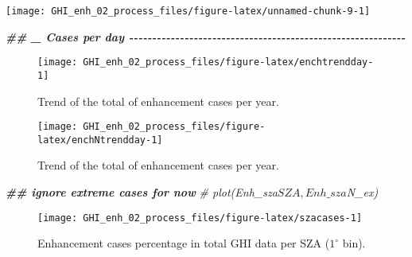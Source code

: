 \documentclass[
  10pt,
  a4paper,oneside]{article}
\newenvironment{Shaded}{\begin{snugshade}}{\end{snugshade}}
\newcommand{\CommentTok}[1]{\textcolor[rgb]{0.56,0.35,0.01}{\textit{#1}}}
\newcommand{\DocumentationTok}[1]{\textcolor[rgb]{0.56,0.35,0.01}{\textbf{\textit{#1}}}}
\begin{document}
\begin{center}\texttt{[image: GHI\_enh\_02\_process\_files/figure-latex/unnamed-chunk-9-1]} \end{center}

\begin{Shaded}
\begin{Highlighting}[]
\DocumentationTok{\#\# \_ Cases per day  {-}{-}{-}{-}{-}{-}{-}{-}{-}{-}{-}{-}{-}{-}{-}{-}{-}{-}{-}{-}{-}{-}{-}{-}{-}{-}{-}{-}{-}{-}{-}{-}{-}{-}{-}{-}{-}{-}{-}{-}{-}{-}{-}{-}{-}{-}{-}{-}{-}{-}{-}{-}{-}{-}{-}{-}{-}{-}{-}{-}}
\end{Highlighting}
\end{Shaded}

\begin{figure}

{\centering \texttt{[image: GHI\_enh\_02\_process\_files/figure-latex/enchtrendday-1]} 

}

\caption{Trend of the total of enhancement cases per year.}\label{fig:enchtrendday}
\end{figure}

\begin{figure}

{\centering \texttt{[image: GHI\_enh\_02\_process\_files/figure-latex/enchNtrendday-1]} 

}

\caption{Trend of the total of enhancement cases per year.}\label{fig:enchNtrendday}
\end{figure}

\begin{Shaded}
\begin{Highlighting}[]
\DocumentationTok{\#\# ignore extreme cases for now}
\CommentTok{\# plot(Enh\_sza$SZA, Enh\_sza$N\_ex)}
\end{Highlighting}
\end{Shaded}

\begin{figure}

{\centering \texttt{[image: GHI\_enh\_02\_process\_files/figure-latex/szacases-1]} 

}

\caption{Enhancement cases percentage in total GHI data per SZA ($1^\circ$ bin).}\label{fig:szacases}
\end{figure}
\end{document}
